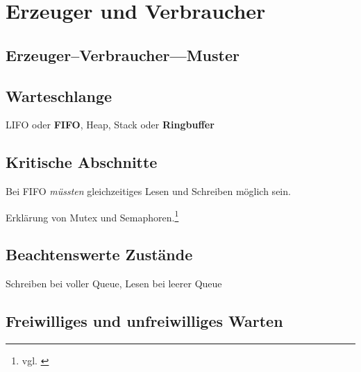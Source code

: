 
\section{Erzeuger und Verbraucher} %
\label{sec:erzeuger_und_verbraucher}

\subsection{Erzeuger–Verbraucher—Muster} %
\label{sub:erzeuger_verbraucher_muster}


\subsection{Warteschlange} %
\label{sub:warteschlange}

\ac{LIFO} oder \textbf{\ac{FIFO}}, Heap, Stack oder \textbf{Ringbuffer}


\subsection{Kritische Abschnitte} %
\label{sub:kritische_abschnitte}

Bei \ac{FIFO} \textit{müssten} gleichzeitiges Lesen und Schreiben möglich sein.

Erklärung von Mutex und Semaphoren.\footnote{vgl. \cite{oscon}}


\subsection{Beachtenswerte Zustände} %
\label{sub:beachtenswerte_zustande}

Schreiben bei voller Queue, Lesen bei leerer Queue


\subsection{Freiwilliges und unfreiwilliges Warten} %
\label{sub:freiwilliges_und_unfreiwilliges_warten}

